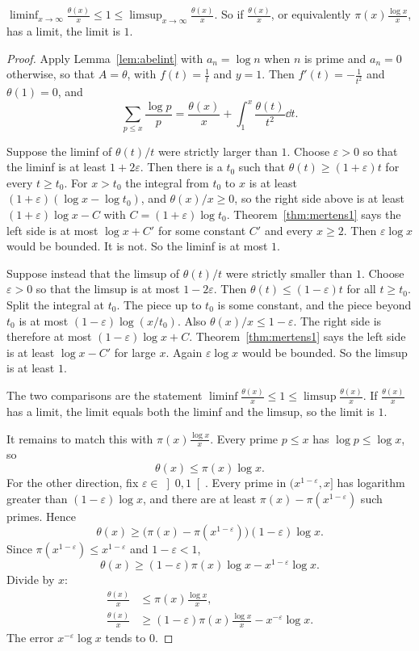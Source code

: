 \begin{corollary}[Chebyshev, 1852]\label{cor:chebratio}
$\displaystyle\liminf_{x\to\infty}\frac{\theta(x)}x\le 1\le\limsup_{x\to\infty}\frac{\theta(x)}x$. So if $\frac{\theta(x)}x$, or equivalently $\pi(x)\frac{\log x}x$, has a limit, the limit is $1$.
\end{corollary}
\begin{proof}
Apply Lemma~\ref{lem:abelint} with $a_n=\log n$ when $n$ is prime and $a_n=0$ otherwise, so that $A=\theta$, with $f(t)=\frac1t$ and $y=1$. Then $f'(t)=-\frac1{t^2}$ and $\theta(1)=0$, and
\[
\sum_{p\le x}\frac{\log p}p=\frac{\theta(x)}x+\int_1^x\frac{\theta(t)}{t^2}\dd t.
\]

Suppose the liminf of $\theta(t)/t$ were strictly larger than $1$. Choose $\varepsilon>0$ so that the liminf is at least $1+2\varepsilon$. Then there is a $t_0$ such that $\theta(t)\ge(1+\varepsilon)t$ for every $t\ge t_0$. For $x>t_0$ the integral from $t_0$ to $x$ is at least $(1+\varepsilon)(\log x-\log t_0)$, and $\theta(x)/x\ge 0$, so the right side above is at least $(1+\varepsilon)\log x-C$ with $C=(1+\varepsilon)\log t_0$. Theorem~\ref{thm:mertens1} says the left side is at most $\log x+C'$ for some constant $C'$ and every $x\ge 2$. Then $\varepsilon\log x$ would be bounded. It is not. So the liminf is at most $1$.

Suppose instead that the limsup of $\theta(t)/t$ were strictly smaller than $1$. Choose $\varepsilon>0$ so that the limsup is at most $1-2\varepsilon$. Then $\theta(t)\le(1-\varepsilon)t$ for all $t\ge t_0$. Split the integral at $t_0$. The piece up to $t_0$ is some constant, and the piece beyond $t_0$ is at most $(1-\varepsilon)\log(x/t_0)$. Also $\theta(x)/x\le 1-\varepsilon$. The right side is therefore at most $(1-\varepsilon)\log x+C$. Theorem~\ref{thm:mertens1} says the left side is at least $\log x-C'$ for large $x$. Again $\varepsilon\log x$ would be bounded. So the limsup is at least $1$.

The two comparisons are the statement $\liminf\frac{\theta(x)}x\le 1\le\limsup\frac{\theta(x)}x$. If $\frac{\theta(x)}x$ has a limit, the limit equals both the liminf and the limsup, so the limit is $1$.

It remains to match this with $\pi(x)\frac{\log x}x$. Every prime $p\le x$ has $\log p\le\log x$, so
\[
\theta(x)\le\pi(x)\log x.
\]
For the other direction, fix $\varepsilon\in\left]0,1\right[$. Every prime in $(x^{1-\varepsilon},x]$ has logarithm greater than $(1-\varepsilon)\log x$, and there are at least $\pi(x)-\pi(x^{1-\varepsilon})$ such primes. Hence
\[
\theta(x)\ge\bigl(\pi(x)-\pi(x^{1-\varepsilon})\bigr)(1-\varepsilon)\log x.
\]
Since $\pi(x^{1-\varepsilon})\le x^{1-\varepsilon}$ and $1-\varepsilon<1$,
\[
\theta(x)\ge(1-\varepsilon)\pi(x)\log x-x^{1-\varepsilon}\log x.
\]
Divide by $x$:
\begin{align*}
\frac{\theta(x)}x&\le\pi(x)\frac{\log x}x,\\
\frac{\theta(x)}x&\ge(1-\varepsilon)\pi(x)\frac{\log x}x-x^{-\varepsilon}\log x.
\end{align*}
The error $x^{-\varepsilon}\log x$ tends to $0$.


\end{proof}
